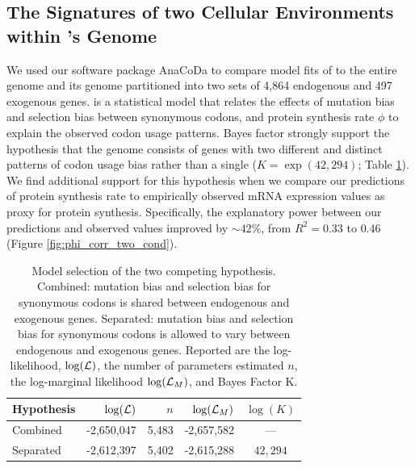 \documentclass[fleqn,letterpaper]{article}
\begin{document}
\subsection*{The Signatures of two Cellular Environments within \kluyveri's Genome}
We used our software package AnaCoDa \citep{landerer2018} to compare model fits of \ROC to the entire \kluyveri genome and its genome partitioned into two sets of 4,864 endogenous and 497 exogenous genes.
\ROC is a statistical model that relates the effects of mutation bias \DM and selection bias \DE between synonymous codons, and protein synthesis rate $\phi$ to explain the observed codon usage patterns.
Bayes factor strongly support the hypothesis that the \kluyveri genome consists of genes with two different and distinct patterns of codon usage bias rather than a single ($K = \exp(42,294)$; Table \ref{tab:AIC_klu}).
We find additional support for this hypothesis when we compare our predictions of protein synthesis rate to empirically observed mRNA expression values as proxy for protein synthesis.
Specifically, the explanatory power between our predictions and observed values improved by $\sim 42\%$, from $R^2 = 0.33$ to $0.46$ (Figure \ref{fig:phi_corr_two_cond}).

\begin{table}
  \centering
  \caption{Model selection of the two competing hypothesis. 
  Combined: mutation bias and selection bias for synonymous codons is shared between endogenous and exogenous genes.
  Separated: mutation bias and selection bias for synonymous codons is allowed to vary between endogenous and exogenous genes.
  Reported are the log-likelihood, $\log(\mathcal{L})$, the number of parameters estimated $n$, the log-marginal likelihood $\log(\mathcal{L}_M)$, and Bayes Factor K.}
  \begin{tabular}{lrrrc}
    \hline
    Hypothesis             & $\log(\mathcal{L})$ &$n$ & $\log(\mathcal{L}_M)$ & $\log(K)$\\ \hline 
    Combined               & -2,650,047 & 5,483 & -2,657,582 & --- \\
    Separated		   & -2,612,397 & 5,402 & -2,615,288 & $42,294$\\ \hline
  \end{tabular}
  \label{tab:AIC_klu}
\end{table}
\end{document}
